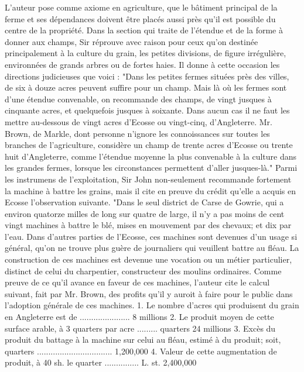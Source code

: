 L'auteur pose comme axiome en agriculture, que le bâtiment principal de la ferme et ses dépendances doivent être placés aussi près qu'il est possible du centre de la propriété. Dans la section qui traite de l'étendue et de la forme à donner aux champs, Sir réprouve avec raison pour ceux qu'on\setcounter{page}{416} destinée principalement à la culture du grain, les petites divisions, de figure irrégulière, environnées de grands arbres ou de fortes haies. Il donne à cette occasion les directions judicieuses que voici : "Dans les petites fermes situées près des villes, de six à douze acres peuvent suffire pour un champ. Mais là où les fermes sont d'une étendue convenable, on recommande des champs, de vingt jusques à cinquante acres, et quelquefois jusques à soixante. Dans aucun cas il ne faut les mettre au-dessous de vingt acres d'Ecosse ou vingt-cinq, d'Angleterre. Mr. Brown, de Markle, dont personne n'ignore les connoissances sur toutes les branches de l'agriculture, considère un champ de trente acres d'Ecosse ou trente huit d'Angleterre, comme l'étendue moyenne la plus convenable à la culture dans les grandes fermes, lorsque les circonstances permettent d'aller jusques-là." Parmi les instrumens de l'exploitation, Sir John non-seulement recommande fortement la machine à battre les grains, mais il cite en preuve du crédit qu'elle a acquis en Ecosse l'observation suivante. "Dans le seul district de Carse de Gowrie, qui a environ quatorze milles de long sur quatre de large, il n'y a pas moins de cent\setcounter{page}{417} vingt machines à battre le blé, mises en mouvement par des chevaux; et dix par l'eau. Dans d'autres parties de l'Ecosse, ces machines sont devenues d'un usage si général, qu'on ne trouve plus guère de journaliers qui veuillent battre au fléau. La construction de ces machines est devenue une vocation ou un métier particulier, distinct de celui du charpentier, constructeur des moulins ordinaires.
Comme preuve de ce qu'il avance en faveur de ces machines, l'auteur cite le calcul suivant, fait par Mr. Brown, des profits qu'il y auroit à faire pour le public dans l'adoption générale de ces machines.
1. Le nombre d'acres qui produisent du grain en Angleterre est de ...................... 8 millions
2. Le produit moyen de cette surface arable, à 3 quarters par acre ......... quarters 24 millions
3. Excès du produit du battage à la machine sur celui au fléau, estimé à du produit; soit, quarters ................................. 1,200,000
4. Valeur de cette augmentation de produit, à 40 sh. le quarter ............... L. st. 2,400,000
